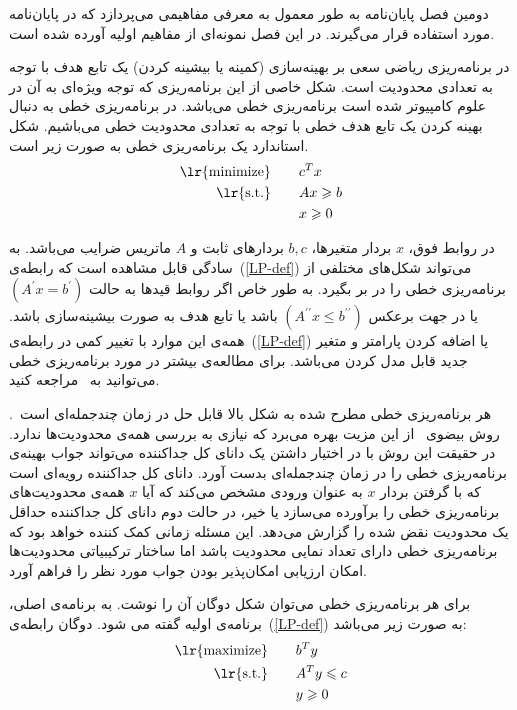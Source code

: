 

دومین فصل پایان‌نامه به طور معمول به معرفی مفاهیمی می‌پردازد که در پایان‌نامه مورد استفاده قرار می‌گیرند.
در این فصل نمونه‌ای از مفاهیم اولیه آورده شده است.



در برنامه‌ریزی‌ ریاضی سعی بر بهینه‌سازی (کمینه یا بیشینه کردن) یک تابع هدف با توجه به تعدادی محدودیت است. شکل خاصی از این برنامه‌ریزی که توجه ويژه‌ای به آن در علوم کامپیوتر شده است برنامه‌ریزی خطی می‌باشد. در برنامه‌ریزی خطی به دنبال بهینه کردن یک تابع هدف خطی با توجه به تعدادی محدودیت خطی می‌باشیم. شکل استاندارد یک برنامه‌ریزی خطی به صورت زیر است.
\begin{alignat}{3}
\text{\lr{minimize}}   & \quad &&  c^T x       \label{LP-def}  \\
\text{\lr{s.t.}}           & &&  Ax \geq b   \notag           \\
                       	& &&   x \geq 0     \notag 
\end{alignat}

در روابط فوق، $x$ بردار متغیرها،  $b, c$ بردارهای ثابت و $A$ ماتریس ضرایب می‌باشد. به سادگی قابل مشاهده است که رابطه‌ی~(\ref{LP-def}) می‌تواند شکل‌های مختلفی از برنامه‌ریزی خطی را در بر بگیرد. به طور خاص اگر روابط قید‌ها به حالت $(A^\prime x=b^ \prime)$ یا در جهت برعکس $(A^{\prime\prime} x \leq b^{\prime\prime} )$ باشد یا تابع هدف به صورت بیشینه‌سازی باشد. همه‌ی این موارد با تغییر کمی در رابطه‌ی~(\ref{LP-def}) یا اضافه کردن پارامتر و متغیر جدید قابل مدل کردن می‌باشد. برای مطالعه‌ی بیشتر در مورد برنامه‌ریزی خطی می‌توانید به~\cite{Sch86}  مراجعه کنید.

هر برنامه‌ریزی خطی مطرح شده به شکل بالا قابل حل در زمان چندجمله‌ای است~\cite{Kha79,Kar84}. روش بیضوی~\cite{Kha79} از این مزیت بهره می‌برد که نیازی به بررسی همه‌ی محدودیت‌ها ندارد. در حقیقت این روش با در اختیار داشتن یک دانای کل جداکننده می‌تواند جواب بهینه‌ی برنامه‌ریزی خطی را در زمان چندجمله‌ای بدست آورد. دانای کل جداکننده رویه‌ای است که با گرفتن بردار $x$ به عنوان ورودی مشخص می‌کند که آیا $x$ همه‌ی محدودیت‌های برنامه‌ریزی خطی را برآورده می‌سازد یا خیر‌، در حالت دوم دانای کل جداکننده حداقل یک محدودیت نقض شده را گزارش می‌دهد. این مسئله زمانی کمک کننده خواهد بود که برنامه‌ریزی خطی دارای تعداد نمایی محدودیت باشد اما ساختار ترکیبیاتی محدودیت‌ها امکان ارزیابی امکان‌پذیر بودن جواب مورد نظر را فراهم آورد.

برای هر برنامه‌ریزی خطی می‌توان شکل دوگان آن را نوشت. به برنامه‌ی اصلی، برنامه‌ی اولیه گفته  می شود. دوگان رابطه‌ی~(\ref{LP-def}) به صورت زیر می‌باشد:
\begin{alignat}{3}
\text{\lr{maximize}}   & \quad &&    b^T y           \label{DUAL-def}  \\
\text{\lr{s.t.}}          &  &&    A^T y \leq c  \notag  \\
                       &  &&	y \geq 0        \notag 
\end{alignat}

